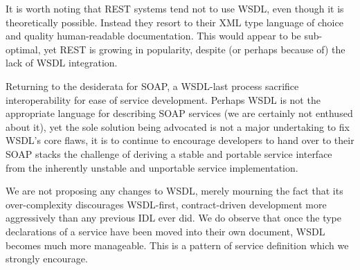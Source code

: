 It is worth noting that REST systems \cite{fielding:rest} tend not to
use WSDL, even though it is theoretically possible. Instead they
resort to their XML type language of choice and quality human-readable
documentation. This would appear to be sub-optimal, yet REST is
growing in popularity, despite (or perhaps because of) the lack of
WSDL integration.

Returning to the desiderata for SOAP, a WSDL-last process sacrifice
interoperability for ease of service development. Perhaps WSDL is not
the appropriate language for describing SOAP services (we are
certainly not enthused about it), yet the sole solution being
advocated is not a major undertaking to fix WSDL's core flaws, it is
to continue to encourage developers to hand over to their SOAP stacks
the challenge of deriving a stable and portable service interface from
the inherently unstable and unportable service implementation.

We are not proposing any changes to WSDL, merely mourning the fact
that its over-complexity discourages WSDL-first, contract-driven
development more aggressively than any previous IDL ever did. We do
observe that once the type declarations of a service have been moved
into their own document, WSDL becomes much more manageable. This is a
pattern of service definition which we strongly encourage.
